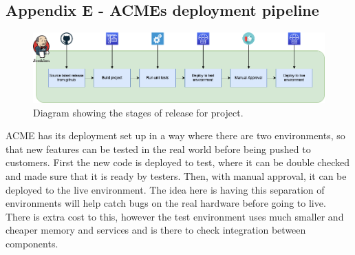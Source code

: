 \newpage
\subsection{Appendix E - ACMEs deployment pipeline}
\label{sec:AppendixE}

  \begin{figure}[H]
    \centering
    \includegraphics[width=12cm]{assets/relasePipeline.drawio.png}
    \caption{Diagram showing the stages of release for project.}
    \label{fig:releasePipeline}
  \end{figure}

  ACME has its deployment set up in a way where there are two environments, so that new features can be tested in the real world before being pushed to customers.
  First the new code is deployed to test, where it can be double checked and made sure that it is ready by testers. Then, with manual approval, it can be 
  deployed to the live environment. The idea here is having this separation of environments will help catch bugs on the real hardware before going to live.
  There is extra cost to this, however the test environment uses much smaller and cheaper memory and services and is there to check integration between 
  components.
